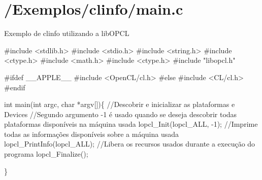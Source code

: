 \section{/\+Exemplos/clinfo/main.\+c}
Exemplo de clinfo utilizando a lib\+O\+P\+CL


\begin{DoxyCodeInclude}

\textcolor{preprocessor}{#include <stdlib.h>}
\textcolor{preprocessor}{#include <stdio.h>}
\textcolor{preprocessor}{#include <string.h>}
\textcolor{preprocessor}{#include <ctype.h>}
\textcolor{preprocessor}{#include <math.h>}
\textcolor{preprocessor}{#include <ctype.h>}
\textcolor{preprocessor}{#include "libopcl.h"}

\textcolor{preprocessor}{#ifdef \_\_APPLE\_\_}
\textcolor{preprocessor}{    #include <OpenCL/cl.h>}
\textcolor{preprocessor}{#else}
\textcolor{preprocessor}{    #include <CL/cl.h>}
\textcolor{preprocessor}{#endif}

\textcolor{keywordtype}{int} main(\textcolor{keywordtype}{int} argc, \textcolor{keywordtype}{char} *argv[])\{
    \textcolor{comment}{//Descobrir e inicializar as plataformas e Devices}
    \textcolor{comment}{//Segundo argumento -1 é usado quando se deseja descobrir todas plataformas disponíveis na máquina
       usada}
    lopcl_Init(lopcl_ALL, -1);
    \textcolor{comment}{//Imprime todas as informações disponíveis sobre a máquina usada}
    lopcl_PrintInfo(lopcl_ALL);
    \textcolor{comment}{//Libera os recursos usados durante a execução do programa}
    lopcl_Finalize();

\}
\end{DoxyCodeInclude}
 